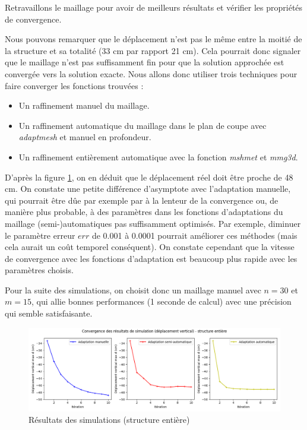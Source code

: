 \begin{problem}{4}
    Retravaillons le maillage pour avoir de meilleurs résultats et vérifier les propriétés de convergence.
\end{problem}


    Nous pouvons remarquer que le déplacement n'est pas le même entre la moitié de la structure et sa totalité (33 cm par rapport 21 cm).
    Cela pourrait donc signaler que le maillage n'est pas suffisamment fin pour que la solution approchée est convergée vers la solution exacte.
    Nous allons donc utiliser trois techniques pour faire converger les fonctions trouvées :
    \begin{itemize}
        \item Un raffinement manuel du maillage.
        \item Un raffinement automatique du maillage dans le plan de coupe avec \emph{adaptmesh} et manuel en profondeur.
        \item Un raffinement entièrement automatique avec la fonction \emph{mshmet} et \emph{mmg3d}.
    \end{itemize}

    D'après la figure \ref{fig:cvg}, on en déduit que le déplacement réel doit être proche de 48 cm. On constate une petite différence d'asymptote avec l'adaptation manuelle,
    qui pourrait être dûe par exemple par à la lenteur de la convergence ou, de manière plus probable, à des paramètres dans les fonctions d'adaptations du maillage
    (semi-)automatiques pas suffisamment optimisés. Par exemple, diminuer le paramètre erreur $err$ de 0.001 à 0.0001 pourrait améliorer ces méthodes (mais cela aurait un
    coût temporel conséquent). On constate cependant que la vitesse de convergence avec les fonctions d'adaptation est beaucoup plus rapide avec les paramètres choisis.

    Pour la suite des simulations, on choisit donc un maillage manuel avec $n=30$ et $m=15$, qui allie bonnes performances (1 seconde de calcul) avec une précision qui semble satisfaisante.
    
    \begin{figure}        
        \begin{center}
        
            \includegraphics[width=16.5cm]{imgs/cvg.png}
            \caption{Résultats des simulations (structure entière)}
            \label{fig:cvg}
        
        \end{center}
    \end{figure}


